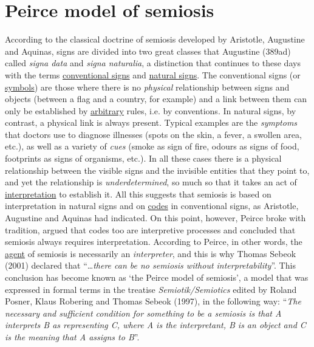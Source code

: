 \documentclass[12pt]{article}
\begin{document}
\hypertarget{peirce_model_of_semiosis}{}
\section{Peirce model of semiosis}
According to the classical doctrine of semiosis developed by Aristotle, Augustine and Aquinas, signs are divided into two great classes that Augustine (389ad) called \textit{signa data} and \textit{signa naturalia}, a distinction that continues to these days with the terms \hyperlink{conventional_signs}{conventional signs} and \hyperlink{natural_signs}{natural signs}. The conventional signs (or \hyperlink{icons_indexes_and_symbols}{symbols}) are those where there is no \textit{physical} relationship between signs and objects (between a flag and a country, for example) and a link between them can only be established by \hyperlink{arbitrariness}{arbitrary} rules, i.e. by conventions. In natural signs, by contrast, a physical link is always present. Typical examples are the \textit{symptoms} that doctors use to diagnose illnesses (spots on the skin, a fever, a swollen area, etc.), as well as a variety of \textit{cues} (smoke as sign of fire, odours as signs of food, footprints as signs of organisms, etc.). In all these cases there is a physical relationship between the visible signs and the invisible entities that they point to, and yet the relationship is \textit{underdetermined}, so much so that it takes an act of \hyperlink{interpretation}{interpretation} to establish it. All this suggests that semiosis is based on interpretation in natural signs and on \hyperlink{code}{codes} in conventional signs, as Aristotle, Augustine and Aquinas had indicated. On this point, however, Peirce broke with tradition, argued that codes too are interpretive processes and concluded that semiosis always requires interpretation. According to Peirce, in other words, the \hyperlink{agent}{agent} of semiosis is necessarily an \textit{interpreter}, and this is why Thomas Sebeok (2001) declared that ``\ldots \textit{there can be no semiosis without interpretability}''. This conclusion has become known as `the Peirce model of semiosis', a model that was expressed in formal terms in the treatise \textit{Semiotik/Semiotics} edited by Roland Posner, Klaus Robering and Thomas Sebeok (1997), in the following way: ``\textit{The necessary and sufficient condition for something to be a semiosis is that A interprets B as representing C, where A is the interpretant, B is an object and C is the meaning that A assigns to B}''.
\end{document}
